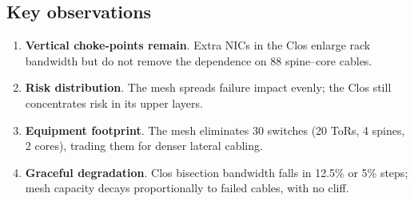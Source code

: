 \subsection{Key observations}

\begin{enumerate}
  \item \textbf{Vertical choke‑points remain}.  
        Extra NICs in the Clos enlarge rack bandwidth but do not remove
        the dependence on 88 spine--core cables.
  \item \textbf{Risk distribution}.  
        The mesh spreads failure impact evenly; the Clos still
        concentrates risk in its upper layers.
  \item \textbf{Equipment footprint}.  
        The mesh eliminates 30 switches (20 ToRs, 4 spines, 2 cores),
        trading them for denser lateral cabling.
  \item \textbf{Graceful degradation}.  
        Clos bisection bandwidth falls in 12.5\% or 5\% steps; mesh
        capacity decays proportionally to failed cables, with no cliff.
\end{enumerate}
